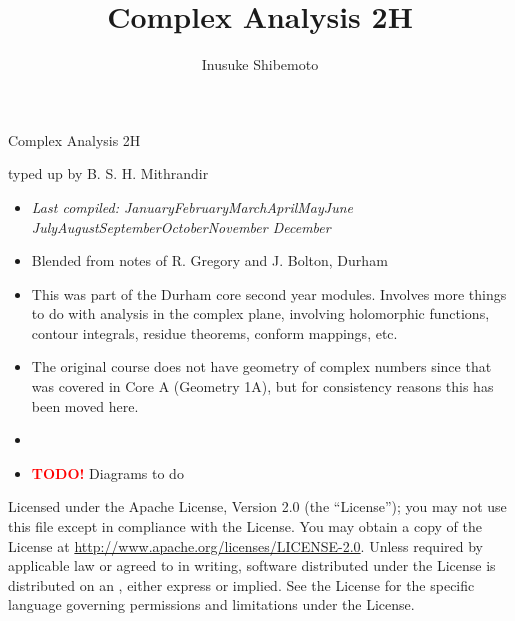 \documentclass[letter-paper]{tufte-book}
\title{Complex Analysis 2H}
\author[]{Inusuke Shibemoto}
\newcommand{\monthyear}{%
  \ifcase\month\or January\or February\or March\or April\or May\or June\or
  July\or August\or September\or October\or November\or
  December\fi\space\number\year
}
\newcommand{\TODO}{\textcolor{red}{\bf TODO!}\xspace}
\begin{document}



\chapter*{}

\begin{fullwidth}

\par \begin{center}{\Huge Complex Analysis 2H}\end{center}

\vspace*{5mm}

\par \begin{center}{\Large typed up by B. S. H. Mithrandir}\end{center}

\vspace*{5mm}

\begin{itemize}
  \item \textit{Last compiled: \monthyear}
  \item Blended from notes of R. Gregory and J. Bolton, Durham
  \item This was part of the Durham core second year modules. Involves more
  things to do with analysis in the complex plane, involving holomorphic
  functions, contour integrals, residue theorems, conform mappings, etc.
  \item The original course does not have geometry of complex numbers since that
  was covered in Core A (Geometry 1A), but for consistency reasons this has been
  moved here.
  \item[]
  \item \TODO Diagrams to do
\end{itemize}

\par

\par Licensed under the Apache License, Version 2.0 (the ``License''); you may not
use this file except in compliance with the License. You may obtain a copy
of the License at \url{http://www.apache.org/licenses/LICENSE-2.0}. Unless
required by applicable law or agreed to in writing, software distributed
under the License is distributed on an , either express or implied. See the
License for the specific language governing permissions and limitations
under the License.
\end{fullwidth}
\end{document}
